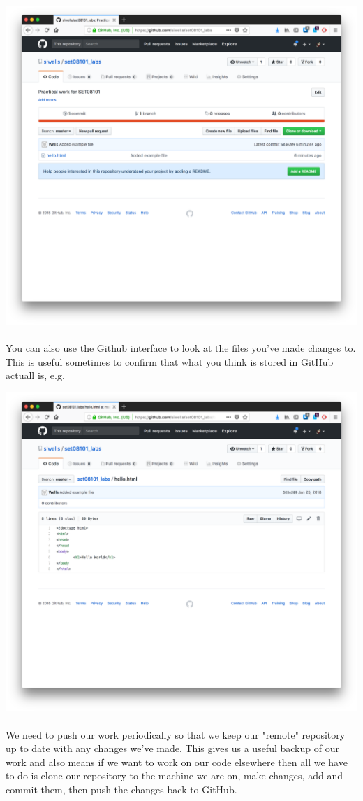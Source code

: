 \documentclass[10pt, a4paper, twosize]{article}
\begin{document}
\includegraphics[width=.8\textwidth]{images/github-after-push}

\paragraph{} You can also use the Github interface to look at the files you've made changes to. This is useful sometimes to confirm that what you think is stored in GitHub actuall is, e.g.

\includegraphics[width=.8\textwidth]{images/github-view-file}

\paragraph{} We need to push our work periodically so that we keep our "remote" repository up to date with any changes we've made. This gives us a useful backup of our work and also means if we want to work on our code elsewhere then all we have to do is clone our repository to the machine we are on, make changes, add and commit them, then push the changes back to GitHub.
\end{document}
